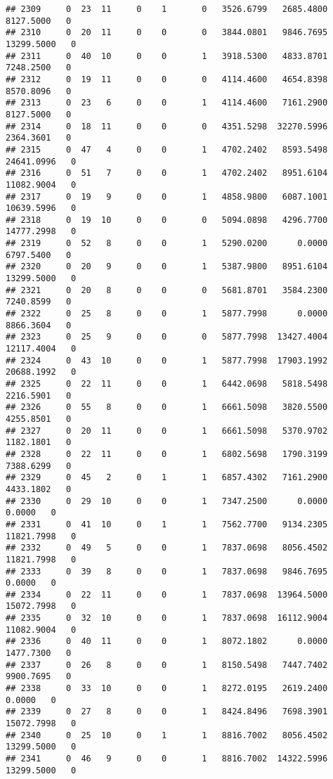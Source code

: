 \documentclass[
]{article}
\begin{document}
\begin{enumerate}
\begin{verbatim}
## 2309     0  23  11     0    1       0   3526.6799   2685.4800   8127.5000   0
## 2310     0  20  11     0    0       0   3844.0801   9846.7695  13299.5000   0
## 2311     0  40  10     0    0       1   3918.5300   4833.8701   7248.2500   0
## 2312     0  19  11     0    0       0   4114.4600   4654.8398   8570.8096   0
## 2313     0  23   6     0    0       1   4114.4600   7161.2900   8127.5000   0
## 2314     0  18  11     0    0       0   4351.5298  32270.5996   2364.3601   0
## 2315     0  47   4     0    0       1   4702.2402   8593.5498  24641.0996   0
## 2316     0  51   7     0    0       1   4702.2402   8951.6104  11082.9004   0
## 2317     0  19   9     0    0       1   4858.9800   6087.1001  10639.5996   0
## 2318     0  19  10     0    0       0   5094.0898   4296.7700  14777.2998   0
## 2319     0  52   8     0    0       1   5290.0200      0.0000   6797.5400   0
## 2320     0  20   9     0    0       1   5387.9800   8951.6104  13299.5000   0
## 2321     0  20   8     0    0       0   5681.8701   3584.2300   7240.8599   0
## 2322     0  25   8     0    0       1   5877.7998      0.0000   8866.3604   0
## 2323     0  25   9     0    0       0   5877.7998  13427.4004  12117.4004   0
## 2324     0  43  10     0    0       1   5877.7998  17903.1992  20688.1992   0
## 2325     0  22  11     0    0       1   6442.0698   5818.5498   2216.5901   0
## 2326     0  55   8     0    0       1   6661.5098   3820.5500   4255.8501   0
## 2327     0  20  11     0    0       1   6661.5098   5370.9702   1182.1801   0
## 2328     0  22  11     0    0       1   6802.5698   1790.3199   7388.6299   0
## 2329     0  45   2     0    1       1   6857.4302   7161.2900   4433.1802   0
## 2330     0  29  10     0    0       1   7347.2500      0.0000      0.0000   0
## 2331     0  41  10     0    1       1   7562.7700   9134.2305  11821.7998   0
## 2332     0  49   5     0    0       1   7837.0698   8056.4502  11821.7998   0
## 2333     0  39   8     0    0       1   7837.0698   9846.7695      0.0000   0
## 2334     0  22  11     0    0       1   7837.0698  13964.5000  15072.7998   0
## 2335     0  32  10     0    0       1   7837.0698  16112.9004  11082.9004   0
## 2336     0  40  11     0    0       1   8072.1802      0.0000   1477.7300   0
## 2337     0  26   8     0    0       1   8150.5498   7447.7402   9900.7695   0
## 2338     0  33  10     0    0       1   8272.0195   2619.2400      0.0000   0
## 2339     0  27   8     0    0       1   8424.8496   7698.3901  15072.7998   0
## 2340     0  25  10     0    1       1   8816.7002   8056.4502  13299.5000   0
## 2341     0  46   9     0    0       1   8816.7002  14322.5996  13299.5000   0

\end{verbatim}
\end{enumerate}
\end{document}
